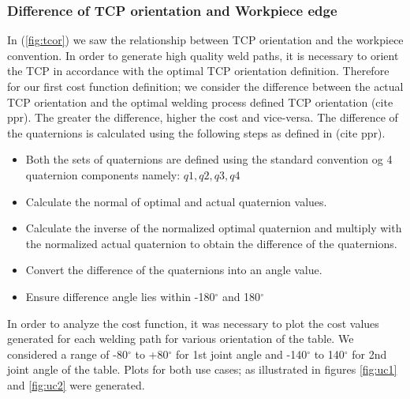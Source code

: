\subsubsection{Difference of TCP orientation and Workpiece edge}
In (\ref{fig:tcor}) we saw the relationship between TCP orientation and the workpiece convention. In order to generate high quality weld paths, it is necessary to orient the TCP in accordance with the optimal TCP orientation definition. Therefore for our first cost function definition; we consider the difference between the actual TCP orientation and the optimal welding process defined TCP orientation (cite ppr). The greater the difference, higher the cost and vice-versa. The difference of the quaternions is calculated using the following steps as defined in (cite ppr).
\begin{itemize}
	\item Both the sets of quaternions are defined using the standard convention og 4 quaternion components namely: $q1,q2,q3,q4$
	\item Calculate the normal of optimal and actual quaternion values.
	\item Calculate the inverse of the normalized optimal quaternion and multiply with the normalized actual quaternion to obtain the difference of the quaternions.
	\item Convert the difference of the quaternions into an angle value.
	\item Ensure difference angle lies within -180$^{\circ}$ and 180$^{\circ}$
\end{itemize}
In order to analyze the cost function, it was necessary to plot the cost values generated for each welding path for various orientation of the table. We considered a range of -80$^{\circ}$ to +80$^{\circ}$ for 1st joint angle and -140$^{\circ}$ to 140$^{\circ}$ for 2nd joint angle of the table. Plots for both use cases; as illustrated in figures \ref{fig:uc1} and \ref{fig:uc2}
were generated.
